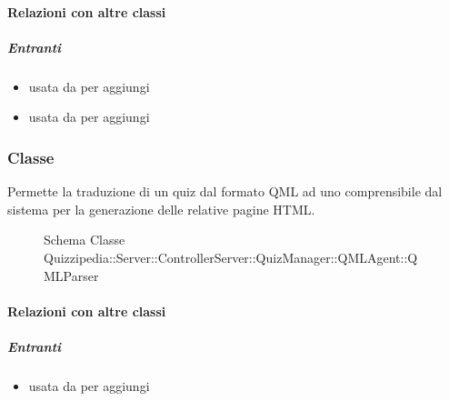 \paragraph{Relazioni con altre classi}
\subparagraph{Entranti}
\begin{itemize}
\item usata da  per aggiungi
\item usata da  per aggiungi
\end{itemize}
\subsubsection{Classe }
Permette la traduzione di un quiz dal formato QML ad uno comprensibile dal sistema per la generazione delle relative pagine HTML.
\begin{figure}[H]
\centering
\noindent{}
\caption[Schema Classe QMLParser]{Schema Classe Quizzipedia::Server::ControllerServer::QuizManager::QMLAgent::QMLParser}
\end{figure}
\paragraph{Relazioni con altre classi}
\subparagraph{Entranti}
\begin{itemize}
\item usata da  per aggiungi
\end{itemize}
